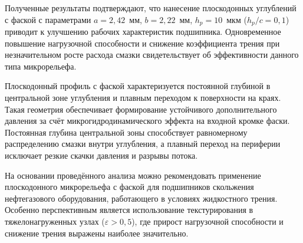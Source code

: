 Полученные результаты подтверждают, что нанесение плоскодонных углублений с фаской с параметрами $a = 2{,}42$~мм, $b = 2{,}22$~мм, $h_p = 10$~мкм ($h_p/c = 0{,}1$) приводит к улучшению рабочих характеристик подшипника. Одновременное повышение нагрузочной способности и снижение коэффициента трения при незначительном росте расхода смазки свидетельствует об эффективности данного типа микрорельефа.

Плоскодонный профиль с фаской характеризуется постоянной глубиной в центральной зоне углубления и плавным переходом к поверхности на краях. Такая геометрия обеспечивает формирование устойчивого дополнительного давления за счёт микрогидродинамического эффекта на входной кромке фаски. Постоянная глубина центральной зоны способствует равномерному распределению смазки внутри углубления, а плавный переход на периферии исключает резкие скачки давления и разрывы потока.

На основании проведённого анализа можно рекомендовать применение плоскодонного микрорельефа с фаской для подшипников скольжения нефтегазового оборудования, работающего в условиях жидкостного трения. Особенно перспективным является использование текстурирования в тяжелонагруженных узлах ($\varepsilon > 0{,}5$), где прирост нагрузочной способности и снижение трения выражены наиболее значительно.
